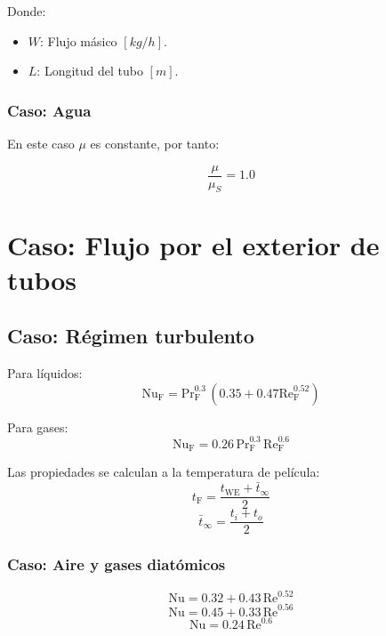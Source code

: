 Donde:
\begin{itemize}
    \item $W$: Flujo másico $[kg/h]$.
    \item $L$: Longitud del tubo $[m]$.
\end{itemize}

\subsubsection{Caso: Agua}
En este caso $\mu$ es constante, por tanto:

\begin{equation*}
    \frac{\mu}{\mu_S} = 1.0
\end{equation*}

\section{Caso: Flujo por el exterior de tubos}

\subsection{Caso: Régimen turbulento}
Para líquidos:
\begin{equation}
    \text{Nu}_\text{F} = \text{Pr}_\text{F}^{0.3}\,
    (0.35+0.47\text{Re}_\text{F}^{0.52})
\end{equation}

Para gases:
\begin{equation}
    \text{Nu}_\text{F} = 0.26\,\text{Pr}_\text{F}^{0.3}\,
    \text{Re}_\text{F}^{0.6}
\end{equation}

Las propiedades se calculan a la temperatura de película:
\begin{equation*}
    t_\text{F} = \frac{t_\text{WE} + \bar{t}_{\infty}}{2}
\end{equation*}
\begin{equation*}
    \bar{t}_\infty = \frac{t_i + t_o}{2}
\end{equation*}

\subsubsection{Caso: Aire y gases diatómicos}
\begin{equation}
    \text{Nu} = 0.32 + 0.43\,\text{Re}^{0.52}
\end{equation}
\begin{equation*}
    \text{Nu} = 0.45 + 0.33\,\text{Re}^{0.56}
\end{equation*}
\begin{equation*}
    \text{Nu} = 0.24\,\text{Re}^{0.6}
\end{equation*}

